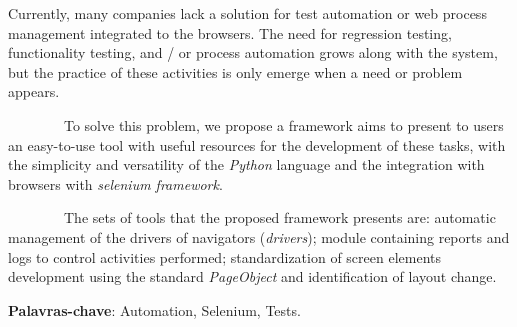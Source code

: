 %
%

\begin{ABSTRACT}
	\begin{SingleSpace}


        Currently, many companies lack a solution for  test automation or web process management integrated to the browsers.
        The need for regression testing, functionality testing, and / or process automation grows along with the system,
        but the practice of these activities is only emerge when a need or problem appears.

        To solve this problem, we propose a framework aims to present to  users an easy-to-use tool with useful resources for the development of these
        tasks, with the simplicity and versatility of the \emph{Python} language and the integration with browsers with \emph{selenium framework}.

        The sets of tools that the proposed framework presents are: automatic management of the drivers of navigators (\emph{drivers}); module containing reports
        and logs to control activities performed; standardization of screen elements development using the standard \emph{PageObject} and identification of layout change.

		\vspace*{0.5cm}\hspace{-1.3 cm}\textbf{Palavras-chave}: Automation, Selenium, Tests.


	\end{SingleSpace}

\end{ABSTRACT}
